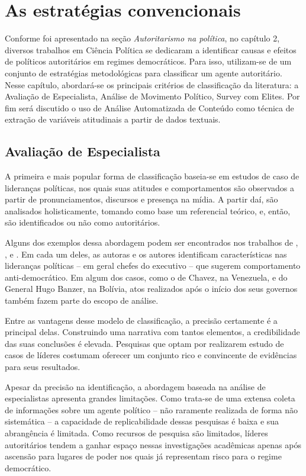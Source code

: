 \documentclass[
12pt,				%
openright,			%
twoside,			%
a4paper,			%
english,			%
french,				%
spanish,			%
brazil				%
]{abntex2}
\begin{document}
\section{As estratégias convencionais}

Conforme foi apresentado na seção \emph{Autoritarismo na política}, no capítulo 2, diversos trabalhos em Ciência Política se dedicaram a identificar causas e efeitos de políticos autoritários em regimes democráticos. Para isso, utilizam-se de um conjunto de estratégias metodológicas para classificar um agente autoritário. Nesse capítulo, abordará-se os principais critérios de classificação da literatura: a Avaliação de Especialista, Análise de Movimento Político, Survey com Elites. Por fim será discutido o uso de Análise Automatizada de Conteúdo como técnica de extração de variáveis atitudinais a partir de dados textuais.

\subsection{Avaliação de Especialista}

A primeira e mais popular forma de classificação baseia-se em estudos de caso de lideranças políticas, nos quais suas atitudes e comportamentos são observados a partir de pronunciamentos, discursos e presença na mídia. A partir daí, são analisados holisticamente, tomando como base um referencial teórico, e, então, são identificados ou não como autoritários.

Alguns dos exemplos dessa abordagem podem ser encontrados nos trabalhos de , ,  e . Em cada um deles, as autoras e os autores identificam características nas lideranças políticas -- em geral chefes do executivo -- que sugerem comportamento anti-democrático. Em algum dos casos, como o de Chavez, na Venezuela, e do General Hugo Banzer, na Bolívia, atos realizados após o início dos seus governos também fazem parte do escopo de análise.

Entre as vantagens desse modelo de classificação, a precisão certamente é a principal delas. Construindo uma narrativa com tantos elementos, a credibilidade das suas conclusões é elevada. Pesquisas que optam por realizarem estudo de casos de líderes costumam oferecer um conjunto rico e convincente de evidências para seus resultados.

Apesar da precisão na identificação, a abordagem baseada na análise de especialistas apresenta grandes limitações. Como trata-se de uma extensa coleta de informações sobre um agente político -- não raramente realizada de forma não sistemática -- a capacidade de replicabilidade dessas pesquisas é baixa e sua abrangência é limitada. Como recursos de pesquisa são limitados, líderes autoritários tendem a ganhar espaço nessas investigações acadêmicas apenas após ascensão para lugares de poder nos quais já representam risco para o regime democrático.
\end{document}
